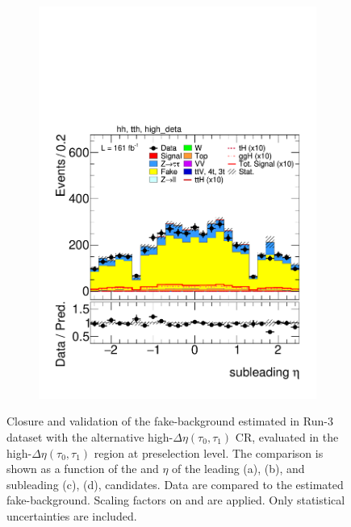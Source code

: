 \begin{figure}[htbp]
\begin{subfigure}[b]{0.45\textwidth}
        \includegraphics[width=\textwidth]{images/using_highdeta_ffs_run3_inclusive_withscaling/plot_tau_1_eta_hh_tth_22_23_24_high_deta.pdf}
        \caption{}
      \end{subfigure}
      \caption{
    Closure and validation of the fake-\tauhad background estimated in Run-3 dataset with the alternative high-$\Delta \eta (\tau_0, \tau_1)$ \tauhadhad CR, evaluated in the high-$\Delta \eta (\tau_0, \tau_1)$ region at preselection level.
    The comparison is shown as a function of the \pt and $\eta$ of the leading (a), (b), and subleading (c), (d), \tauhad candidates. 
    Data are compared to the estimated fake-\tauhad background. Scaling factors on \ztautau and \ttbar are applied. Only statistical uncertainties are included.
  }
  \label{fig:closure_validation_highdeta_run3}
\end{figure}
      

